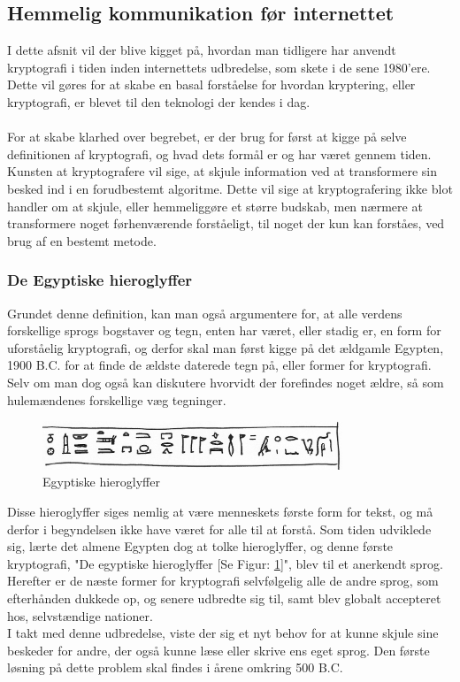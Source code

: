 \subsection{Hemmelig kommunikation før internettet}
I dette afsnit vil der blive kigget på, hvordan man tidligere har anvendt kryptografi i tiden inden internettets udbredelse, som skete i de sene 1980'ere. Dette vil gøres for at skabe en basal forståelse for hvordan kryptering, eller kryptografi, er blevet til den teknologi der kendes i dag.\\\\
\noindent
For at skabe klarhed over begrebet, er der brug for først at kigge på selve definitionen af kryptografi, og hvad dets formål er og har været gennem tiden. 
Kunsten at kryptografere vil sige, at skjule information ved at transformere sin besked ind i en forudbestemt algoritme.
Dette vil sige at kryptografering ikke blot handler om at skjule, eller hemmeliggøre et større budskab, men nærmere at transformere noget førhenværende forståeligt, til noget der kun kan forståes, ved brug af en bestemt metode.\cite{MeningOfCryptography}
\subsubsection{De Egyptiske hieroglyffer}
Grundet denne definition, kan man også argumentere for, at alle verdens forskellige sprogs bogstaver og tegn, enten har været, eller stadig er, en form for uforståelig kryptografi, og derfor skal man først kigge på det ældgamle Egypten, 1900 B.C. for at finde de ældste daterede tegn på, eller former for kryptografi.\cite{PastCryptography} Selv om man dog også kan diskutere hvorvidt der forefindes noget ældre, så som hulemændenes forskellige væg tegninger.
\begin{figure}[H]
    \centering
    \includegraphics[width=0.8\textwidth, angle =0]{Projectdoc/Problemanalyse/Illustrationer/egypten.jpg}
    \caption{Egyptiske hieroglyffer}
    \label{fig:hieroglyffer}
\end{figure}
\noindent
Disse hieroglyffer siges nemlig at være menneskets første form for tekst, og må derfor i begyndelsen ikke have været for alle til at forstå. Som tiden udviklede sig, lærte det almene Egypten dog at tolke hieroglyffer, og denne første kryptografi, "De egyptiske hieroglyffer [Se Figur: \ref{fig:hieroglyffer}]", blev til et anerkendt sprog.
Herefter er de næste former for kryptografi selvfølgelig alle de andre sprog, som efterhånden dukkede op, og senere udbredte sig til, samt blev globalt accepteret hos, selvstændige nationer.\\
I takt med denne udbredelse, viste der sig et nyt behov for at kunne skjule sine beskeder for andre, der også kunne læse eller skrive ens eget sprog. Den første løsning på dette problem skal findes i årene omkring 500 B.C.\cite{PastCryptography}
